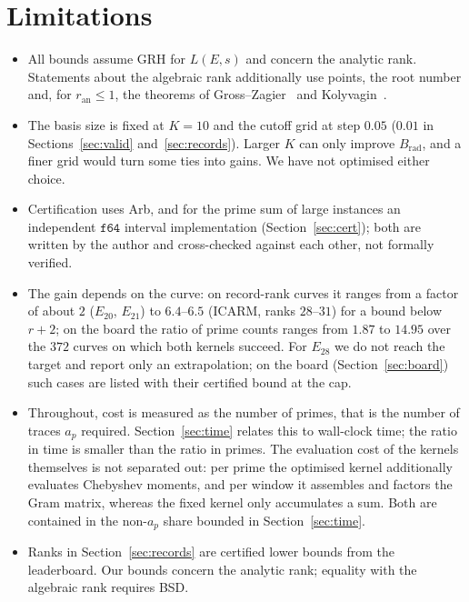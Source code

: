 \documentclass[11pt]{amsart}
\theoremstyle{remark}
\theoremstyle{definition}
\newcommand{\ran}{r_{\mathrm{an}}}
\begin{document}
\section{Limitations}
\begin{itemize}
\item All bounds assume GRH for $L(E,s)$ and concern the analytic rank. Statements about the algebraic rank additionally use points, the root number and, for $\ran\le1$, the theorems of Gross--Zagier~\cite{GZ} and Kolyvagin~\cite{Kolyvagin}.
\item The basis size is fixed at $K=10$ and the cutoff grid at step $0.05$ ($0.01$ in Sections~\ref{sec:valid} and~\ref{sec:records}). Larger $K$ can only improve $B_{\mathrm{rad}}$, and a finer grid would turn some ties into gains. We have not optimised either choice.
\item Certification uses Arb, and for the prime sum of large instances an independent $\mathtt{f64}$ interval implementation (Section~\ref{sec:cert}); both are written by the author and cross-checked against each other, not formally verified.
\item The gain depends on the curve: on record-rank curves it ranges from a factor of about $2$ ($E_{20}$, $E_{21}$) to $6.4$--$6.5$ (ICARM, ranks $28$--$31$) for a bound below $r+2$; on the board the ratio of prime counts ranges from $1.87$ to $14.95$ over the $372$ curves on which both kernels succeed. For $E_{28}$ we do not reach the target and report only an extrapolation; on the board (Section~\ref{sec:board}) such cases are listed with their certified bound at the cap.
\item Throughout, cost is measured as the number of primes, that is the number of traces $a_p$
required. Section~\ref{sec:time} relates this to wall-clock time; the ratio in time is smaller
than the ratio in primes. The evaluation cost of the kernels themselves is not separated out:
per prime the optimised kernel additionally evaluates Chebyshev moments, and per window it
assembles and factors the Gram matrix, whereas the fixed kernel only accumulates a sum. Both
are contained in the non-$a_p$ share bounded in Section~\ref{sec:time}.
\item Ranks in Section~\ref{sec:records} are certified lower bounds from the leaderboard. Our bounds concern the analytic rank; equality with the algebraic rank requires BSD.
\end{itemize}
\end{document}
